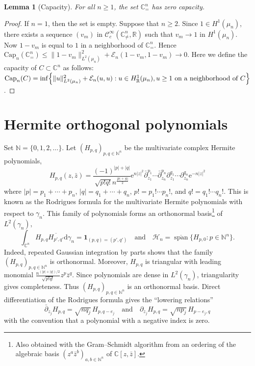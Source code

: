 \documentclass[11pt,reqno]{amsart}
\numberwithin{equation}{section}%
\numberwithin{figure}{section}%
\numberwithin{table}{section}
\theoremstyle{plain}
\newtheorem{lemma}[theorem]{Lemma}
\theoremstyle{definition}
\begin{document}
\begin{lemma}[Capacity]\label{le:capacity}
  For all $n\geq1$, the set $\mathbb{C}^n_{=}$ has zero capacity.
\end{lemma}

\begin{proof}
  If $n=1$, then the set is empty. Suppose that $n\geq2$. Since
  $1\in H^1(\mu_n)$, there exists a sequence ${(v_m)}$ in
  $\mathcal{C}^\infty_c(\mathbb{C}^n_{\neq},\mathbb{R})$ such that $v_m\to1$
  in $H^1(\mu_n)$. Now $1-v_m$ is equal to $1$ in a neighborhood of
  $\mathbb{C}^n_{=}$. Hence
  $\mathrm{Cap}_n(\mathbb{C}^n_{=})\leq\|1-v_m\|_{L^2(\mu_n)}^2+\mathcal{E}_n(1-v_m,1-v_m)\to0$.
  Here we define the capacity of $C\subset\mathbb{C}^n$ as follows:
  $\mathrm{Cap}_n(C)=\inf\Bigl\{\|u\|_{L^2(\mu_n)}^2+\mathcal{E}_n(u,u):u\in
  H^1_{\mathbb{R}}(\mu_n), u\geq1\text{ on a neighborhood of $C$}\Bigr\}$.
\end{proof}

\section{Hermite orthogonal polynomials}
\label{se:hermite}

Set $\mathbb{N}=\{0,1,2,\ldots\}$. Let ${(H_{p,q})}_{p,q\in\mathbb{N}^n}$ be
the multivariate complex Hermite polynomials,
\begin{equation}
  H_{p,q}(z,\bar z)
  =\frac{(-1)^{|p|+|q|}}{\sqrt{p!q!}n^{\frac{|p|+|q|}{2}}}
  \mathrm{e}^{n|z|^2}\bar\partial_{z_1}^{p_1}\cdots\bar\partial_{z_n}^{p_n}\partial_{z_1}^{q_1}\cdots\partial_{z_n}^{q_n}\mathrm{e}^{-n|z|^2}
\end{equation}
where $|p|=p_1+\cdots+p_n$, $|q|=q_1+\cdots+q_n$, $p!=p_1!\cdots p_n!$, and
$q!=q_1!\cdots q_n!$. This is known as the Rodrigues formula for the
multivariate Hermite polynomials with respect to $\gamma_n$. This family of
polynomials forms an orthonormal basis\footnote{Also obtained with the
  Gram--Schmidt algorithm from an ordering of the algebraic basis
  ${(z^a\bar z^b)}_{a,b\in\mathbb{N}^n}$ of $\mathbb{C}[z,\bar z]$.} of
$L^2(\gamma_n)$,
\begin{equation}
  \int_{\mathbb{C}^n}H_{p,q}\overline{H_{p',q'}}\mathrm{d}\gamma_n
  =\mathbf{1}_{(p,q)=(p',q')}
  \quad\text{and}\quad
  \mathcal{H}_n=\overline{\operatorname{span}}\{H_{p,0}:p\in\mathbb N^n\}.
\end{equation}
Indeed, repeated Gaussian integration by parts shows that the family
${(H_{p,q})}_{p,q\in\mathbb{N}^n}$ is orthonormal. Moreover, $H_{p,q}$ is
triangular with leading monomial
$\frac{n^{(|p|+|q|)/2}}{\sqrt{p!q!}}z^p\overline z^q$. Since polynomials are
dense in $L^2(\gamma_n)$, triangularity gives completeness. Thus
${(H_{p,q})}_{p,q\in\mathbb{N}^n}$ is an orthonormal basis. Direct
differentiation of the Rodrigues formula gives the ``lowering relations''
\begin{equation}\label{eq:hermite:lowering}
  \bar\partial_{z_j}H_{p,q}=\sqrt{nq_j}\,H_{p,q-e_j}
  \quad\text{and}\quad
  \partial_{z_j}H_{p,q}=\sqrt{np_j}\,H_{p-e_j,q}
\end{equation}
with the convention that a polynomial with a negative index is zero.
\end{document}
